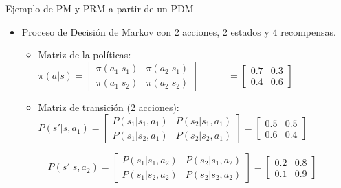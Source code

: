 \documentclass[10pt, envcountsect, handout, aspectratio=1610, hyperref={hypertexnames=true}]{beamer}
\begin{document}
\begin{frame}{Ejemplo de PM y PRM a partir de un PDM}
\begin{itemize}
\item Proceso de Decisión de Markov con 2 acciones, 2 estados y 4 recompensas.

\begin{itemize}
\item Matriz de la políticas: \qquad \qquad \qquad \quad \,
 							 \(\pi(a|s) =
                                \begin{bmatrix}
                                \pi(a_1|s_1) & \pi(a_2|s_1) \\
                                \pi(a_1|s_2) & \pi(a_2|s_2)
                                \end{bmatrix}
                                \qquad\quad
                                =
                                \begin{bmatrix}
                                0.7 & 0.3 \\
                                0.4 & 0.6
                                \end{bmatrix}
                           \)

\item Matriz de transición (2 acciones): \qquad
							\(P(s'|s,a_1) =
                                \begin{bmatrix}
                                P(s_1|s_1,a_1) & P(s_2|s_1,a_1) \\
                                P(s_1|s_2,a_1) & P(s_2|s_2,a_1)
                                \end{bmatrix}
                                =
                                \begin{bmatrix}
                                0.5 & 0.5 \\
                                0.6 & 0.4
                                \end{bmatrix}
                            \)
                            
                            ~\qquad \qquad \qquad \qquad \qquad \qquad \qquad \,
                            \(
                            P(s'|s,a_2) =
                            \begin{bmatrix}
                            P(s_1|s_1,a_2) & P(s_2|s_1,a_2) \\
                            P(s_1|s_2,a_2) & P(s_2|s_2,a_2)
                            \end{bmatrix}
                            =
                            \begin{bmatrix}
                            0.2 & 0.8 \\
                            0.1 & 0.9
                            \end{bmatrix}
                            \)


\end{itemize}
\end{itemize}
\end{frame}
\end{document}
